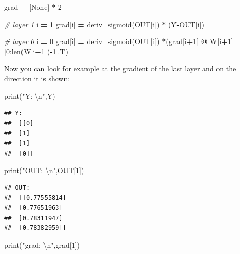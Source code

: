 \documentclass[
]{book}
\newenvironment{Shaded}{\begin{snugshade}}{\end{snugshade}}
\newcommand{\BuiltInTok}[1]{#1}
\newcommand{\CharTok}[1]{\textcolor[rgb]{0.31,0.60,0.02}{#1}}
\newcommand{\CommentTok}[1]{\textcolor[rgb]{0.56,0.35,0.01}{\textit{#1}}}
\newcommand{\DecValTok}[1]{\textcolor[rgb]{0.00,0.00,0.81}{#1}}
\newcommand{\NormalTok}[1]{#1}
\newcommand{\OperatorTok}[1]{\textcolor[rgb]{0.81,0.36,0.00}{\textbf{#1}}}
\newcommand{\StringTok}[1]{\textcolor[rgb]{0.31,0.60,0.02}{#1}}
\newcommand{\VariableTok}[1]{\textcolor[rgb]{0.00,0.00,0.00}{#1}}
\begin{document}
\begin{Shaded}
\begin{Highlighting}[]
\NormalTok{grad }\OperatorTok{=}\NormalTok{ [}\VariableTok{None}\NormalTok{] }\OperatorTok{*} \DecValTok{2}

\CommentTok{\# layer 1}
\NormalTok{i }\OperatorTok{=} \DecValTok{1}
\NormalTok{grad[i] }\OperatorTok{=}\NormalTok{ deriv\_sigmoid(OUT[i]) }\OperatorTok{*}\NormalTok{ (Y}\OperatorTok{{-}}\NormalTok{OUT[i])}

\CommentTok{\# layer 0}
\NormalTok{i }\OperatorTok{=} \DecValTok{0}
\NormalTok{grad[i] }\OperatorTok{=}\NormalTok{ deriv\_sigmoid(OUT[i]) }\OperatorTok{*}\NormalTok{(grad[i}\OperatorTok{+}\DecValTok{1}\NormalTok{] }\OperatorTok{@}\NormalTok{ W[i}\OperatorTok{+}\DecValTok{1}\NormalTok{][}\DecValTok{0}\NormalTok{:}\BuiltInTok{len}\NormalTok{(W[i}\OperatorTok{+}\DecValTok{1}\NormalTok{])}\OperatorTok{{-}}\DecValTok{1}\NormalTok{].T)}
\end{Highlighting}
\end{Shaded}

Now you can look for example at the gradient of the last layer and on the direction it is shown:

\begin{Shaded}
\begin{Highlighting}[]
\BuiltInTok{print}\NormalTok{(}\StringTok{"Y: }\CharTok{\textbackslash{}n}\StringTok{"}\NormalTok{,Y)}
\end{Highlighting}
\end{Shaded}

\begin{verbatim}
## Y: 
##  [[0]
##  [1]
##  [1]
##  [0]]
\end{verbatim}

\begin{Shaded}
\begin{Highlighting}[]
\BuiltInTok{print}\NormalTok{(}\StringTok{"OUT: }\CharTok{\textbackslash{}n}\StringTok{"}\NormalTok{,OUT[}\DecValTok{1}\NormalTok{])}
\end{Highlighting}
\end{Shaded}

\begin{verbatim}
## OUT: 
##  [[0.77555814]
##  [0.77651963]
##  [0.78311947]
##  [0.78382959]]
\end{verbatim}

\begin{Shaded}
\begin{Highlighting}[]
\BuiltInTok{print}\NormalTok{(}\StringTok{"grad: }\CharTok{\textbackslash{}n}\StringTok{"}\NormalTok{,grad[}\DecValTok{1}\NormalTok{])}
\end{Highlighting}
\end{Shaded}
\end{document}

